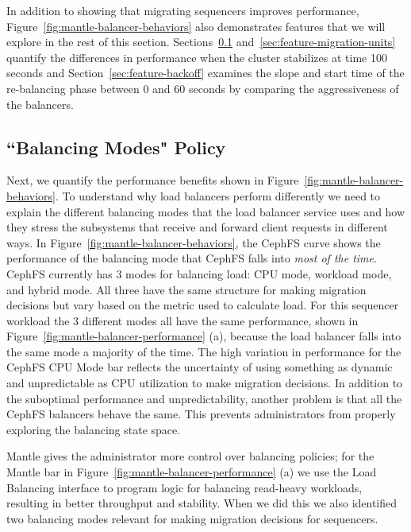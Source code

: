 In addition to showing that migrating sequencers improves performance,
Figure~\ref{fig:mantle-balancer-behaviors} also demonstrates features that we
will explore in the rest of this section.
Sections~\ref{sec:feature-balancing-modes}
and~\ref{sec:feature-migration-units} quantify the differences in performance
when the cluster stabilizes at time 100 seconds and
Section~\ref{sec:feature-backoff} examines the slope and start time of the
re-balancing phase between 0 and 60 seconds by comparing the aggressiveness of
the balancers.

\subsection{``Balancing Modes" Policy}
\label{sec:feature-balancing-modes}

Next, we quantify the performance benefits shown in
Figure~\ref{fig:mantle-balancer-behaviors}.  To understand why load balancers
perform differently we need to explain the different balancing modes that the
load balancer service uses and how they stress the subsystems that receive and
forward client requests in different ways. In
Figure~\ref{fig:mantle-balancer-behaviors}, the CephFS curve shows the
performance of the balancing mode that CephFS falls into {\it most of the
time}.  CephFS currently has 3 modes for balancing load: CPU mode, workload
mode, and hybrid mode. All three have the same structure for making migration
decisions but vary based on the metric used to calculate load. For this
sequencer workload the 3 different modes all have the same performance, shown
in Figure~\ref{fig:mantle-balancer-performance} (a), because the load balancer
falls into the same mode a majority of the time.  The high variation in
performance for the CephFS CPU Mode bar reflects the uncertainty of using
something as dynamic and unpredictable as CPU utilization to make migration
decisions.  In addition to the suboptimal performance and unpredictability,
another problem is that all the CephFS balancers behave the same. This prevents
administrators from properly exploring the balancing state space.

Mantle gives the administrator more control over balancing policies; for the
Mantle bar in Figure~\ref{fig:mantle-balancer-performance} (a) we use the Load
Balancing interface to program logic for balancing read-heavy workloads,
resulting in better throughput and stability.  When we did this we also
identified two balancing modes relevant for making migration decisions for
sequencers. 

